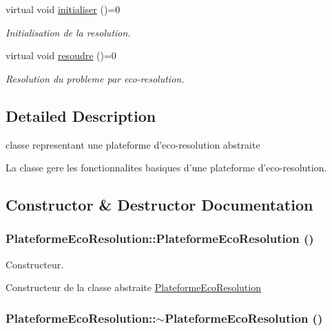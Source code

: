 \begin{CompactItemize}
virtual void \hyperlink{classPlateformeEcoResolution_57d87139f09ca51cd6a4fa7cd2e83351}{initialiser} ()=0
\begin{CompactList}\small\item\em Initialisation de la resolution. \item\end{CompactList}\item 
virtual void \hyperlink{classPlateformeEcoResolution_17f587580cd8aee537551bc0ddd82bef}{resoudre} ()=0
\begin{CompactList}\small\item\em Resolution du probleme par eco-resolution. \item\end{CompactList}\end{CompactItemize}


\subsection{Detailed Description}
classe representant une plateforme d'eco-resolution abstraite 

La classe gere les fonctionnalites basiques d'une plateforme d'eco-resolution. 

\subsection{Constructor \& Destructor Documentation}
\hypertarget{classPlateformeEcoResolution_6e03cc2c6a51bc4a47d2d226e41d13e9}{
\subsubsection[{PlateformeEcoResolution}]{\setlength{\rightskip}{0pt plus 5cm}PlateformeEcoResolution::PlateformeEcoResolution ()}}
\label{classPlateformeEcoResolution_6e03cc2c6a51bc4a47d2d226e41d13e9}


Constructeur. 

Constructeur de la classe abstraite \hyperlink{classPlateformeEcoResolution}{PlateformeEcoResolution} \hypertarget{classPlateformeEcoResolution_356b4862f53c4be870304e5186601b5a}{
\subsubsection[{$\sim$PlateformeEcoResolution}]{\setlength{\rightskip}{0pt plus 5cm}PlateformeEcoResolution::$\sim$PlateformeEcoResolution ()}}
\label{classPlateformeEcoResolution_356b4862f53c4be870304e5186601b5a}


